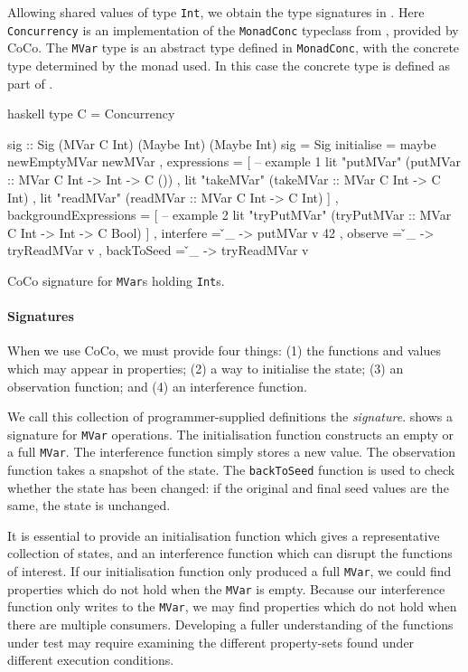 Allowing shared values of type \verb|Int|, we obtain the type
signatures in .  Here \verb|Concurrency| is an
implementation of the \verb|MonadConc| typeclass from
, provided by CoCo.  The \verb|MVar| type is an
abstract type defined in \verb|MonadConc|, with the concrete type
determined by the monad used.  In this case the concrete type is
defined as part of \dejafu{}.

\begin{listing}
\centering
\begin{cminted}{haskell}
type C = Concurrency

sig :: Sig (MVar C Int) (Maybe Int) (Maybe Int)
sig = Sig
  { initialise  = maybe newEmptyMVar newMVar
  , expressions =
    [ -- example 1
      lit "putMVar"  (putMVar  :: MVar C Int -> Int -> C ())
    , lit "takeMVar" (takeMVar :: MVar C Int -> C Int)
    , lit "readMVar" (readMVar :: MVar C Int -> C Int)
    ]
  , backgroundExpressions =
    [ -- example 2
      lit "tryPutMVar" (tryPutMVar :: MVar C Int -> Int -> C Bool)
    ]
  , interfere  = \v _ -> putMVar v 42
  , observe    = \v _ -> tryReadMVar v
  , backToSeed = \v _ -> tryReadMVar v
  }
\end{cminted}
\caption{CoCo signature for \texttt{MVar}s holding \texttt{Int}s.}\label{lst:mvar}
\end{listing}

\paragraph{Signatures}
When we use CoCo, we must provide four things: (1) the functions and
values which may appear in properties; (2) a way to initialise the
state; (3) an observation function; and (4) an interference function.

We call this collection of programmer-supplied definitions the
\emph{signature}.   shows a signature for \verb|MVar|
operations.  The initialisation function constructs an empty or a full
\verb|MVar|.  The interference function simply stores a new value.
The observation function takes a snapshot of the state.  The
\verb|backToSeed| function is used to check whether the state has been
changed: if the original and final seed values are the same, the state
is unchanged.

It is essential to provide an initialisation function which gives a
representative collection of states, and an interference function
which can disrupt the functions of interest.  If our initialisation
function only produced a full \verb|MVar|, we could find properties
which do not hold when the \verb|MVar| is empty.  Because our
interference function only writes to the \verb|MVar|, we may find
properties which do not hold when there are multiple consumers.
Developing a fuller understanding of the functions under test may
require examining the different property-sets found under different
execution conditions.

